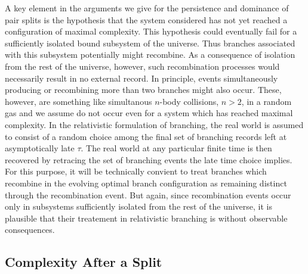 \documentclass[12pt,amsmath,amssymb,onecolumn]{revtex4-2}
\begin{document}
A key element in the arguments we give for the persistence and
dominance of pair splits
is the hypothesis that the system considered has not yet reached
a configuration of maximal complexity.
This hypothesis could eventually fail for
a sufficiently isolated bound subsystem of the universe. 
Thus branches associated with this subsystem
potentially might recombine.
As a consequence of isolation from the rest of the
universe, however, such recombination processes would
necessarily result in no external record.
In principle, events simultaneously producing or recombining more
than two branches might also occur. These, however,
are something like simultanous $n$-body collisions, $n > 2$, 
in a random gas and we assume do not occur even
for a system which has reached maximal complexity.
In the relativistic formulation of branching,
the real world is assumed to consist of
a random choice among
the final set of branching records left
at asymptotically late $\tau$.
The real world at any particular
finite time is then recovered by
retracing the set of branching events
the late time choice implies.
For
this purpose, it will be technically
convient to treat branches which recombine
in the evolving optimal branch configuration
as
remaining distinct through the recombination
event. But again,
since recombination events occur
only in subsystems sufficiently isolated
from the rest of the universe, it
is plausible that their
treatement in relativistic
branching is without observable consequences.



\subsection{\label{subsec:after} Complexity After a Split}
\end{document}
